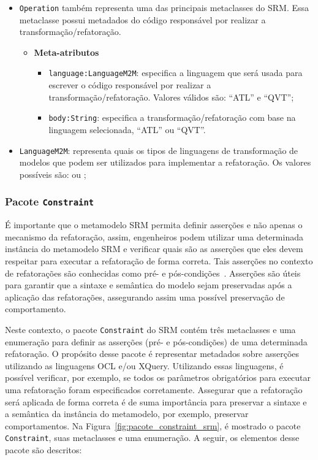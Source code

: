 \begin{itemize}
    \item \texttt{Operation} também representa uma das principais metaclasses do SRM. Essa metaclasse possui metadados do código responsável por realizar a transformação/refatoração.

\begin{itemize}
	\item \textbf{Meta-atributos}
		\begin{itemize}
			\item \texttt{language:LanguageM2M}: especifica a linguagem que será usada para escrever o código responsável por realizar a transformação/refatoração. Valores válidos são: ``ATL'' e ``QVT'';
			\item \texttt{body:String}: especifica a transformação/refatoração com base na linguagem selecionada, ``ATL'' ou ``QVT''.
		\end{itemize}	
\end{itemize}
     
     \item \texttt{LanguageM2M}: representa quais os tipos de linguagens de transformação de modelos que podem ser utilizados para implementar a refatoração. Os valores possíveis são:  ou ;
     
\end{itemize}

\subsubsection{Pacote \texttt{Constraint}}

É importante que o metamodelo SRM permita definir asserções e não apenas o mecanismo da refatoração, assim, engenheiros podem utilizar uma determinada instância do metamodelo SRM e verificar quais são as asserções que eles devem respeitar para executar a refatoração de forma correta. Tais asserções no contexto de refatorações são conhecidas como pré- e pós-condições~\cite{OPDYKE_1992, Roberts_1999}. Asserções são úteis para garantir que a sintaxe e semântica do modelo sejam preservadas após a aplicação das refatorações, assegurando assim uma possível preservação de comportamento.

Neste contexto, o pacote \texttt{Constraint} do SRM contém três metaclasses e uma enumeração para definir as asserções (pré- e pós-condições) de uma determinada refatoração. O propósito desse pacote é representar metadados sobre asserções utilizando as linguagens OCL e/ou XQuery. Utilizando essas linguagens, é possível verificar, por exemplo, se todos os parâmetros obrigatórios para executar uma refatoração foram especificados corretamente. Assegurar que a refatoração será aplicada de forma correta é de suma importância para preservar a sintaxe e a semântica da instância do metamodelo, por exemplo, preservar comportamentos. Na Figura~\ref{fig:pacote_constraint_srm}, é mostrado o pacote \texttt{Constraint}, suas metaclasses e uma enumeração. A seguir, os elementos desse pacote são descritos:

